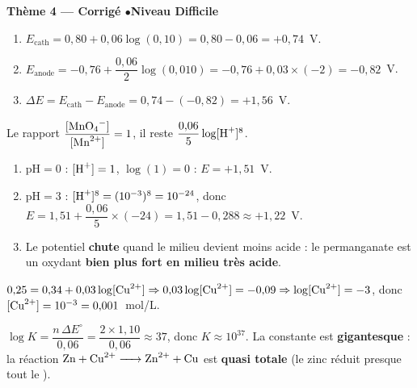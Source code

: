 \documentclass[11pt,a4paper]{article}
\begin{document}
\begin{center}\color{primarydark}\large\bfseries Thème 4 — Corrigé \quad$\bullet$\quad Niveau Difficile\end{center}

\begin{corrige}
\begin{enumerate}[label=\alph*)]
  \item $E_{\text{cath}}=0{,}80+0{,}06\log(0{,}10)=0{,}80-0{,}06=+0{,}74$~V.
  \item $E_{\text{anode}}=-0{,}76+\dfrac{0{,}06}{2}\log(0{,}010)=-0{,}76+0{,}03\times(-2)=-0{,}82$~V.
  \item $\Delta E=E_{\text{cath}}-E_{\text{anode}}=0{,}74-(-0{,}82)=+1{,}56$~V.
\end{enumerate}
\end{corrige}

\begin{corrige}
Le rapport $\dfrac{[\ce{MnO4^-}]}{[\ce{Mn^{2+}}]}=1$, il reste $\dfrac{0{,}06}{5}\log[\ce{H+}]^{8}$.
\begin{enumerate}[label=\alph*)]
  \item $\mathrm{pH}=0$ : $[\ce{H+}]=1$, $\log(1)=0$ : $E=+1{,}51$~V.
  \item $\mathrm{pH}=3$ : $[\ce{H+}]^{8}=(10^{-3})^{8}=10^{-24}$, donc
        $E=1{,}51+\dfrac{0{,}06}{5}\times(-24)=1{,}51-0{,}288\approx +1{,}22$~V.
  \item Le potentiel \textbf{chute} quand le milieu devient moins acide : le permanganate est un
        oxydant \textbf{bien plus fort en milieu très acide}.
\end{enumerate}
\end{corrige}

\begin{corrige}
$0{,}25=0{,}34+0{,}03\log[\ce{Cu^{2+}}]\Rightarrow 0{,}03\log[\ce{Cu^{2+}}]=-0{,}09
\Rightarrow \log[\ce{Cu^{2+}}]=-3$, donc $[\ce{Cu^{2+}}]=10^{-3}=0{,}001$~mol/L.
\end{corrige}

\begin{corrige}
$\log K=\dfrac{n\,\Delta E^{\circ}}{0{,}06}=\dfrac{2\times 1{,}10}{0{,}06}\approx 37$, donc
$K\approx 10^{37}$. La constante est \textbf{gigantesque} : la réaction
$\ce{Zn + Cu^{2+} -> Zn^{2+} + Cu}$ est \textbf{quasi totale} (le zinc réduit presque tout le
).
\end{corrige}
\end{document}
